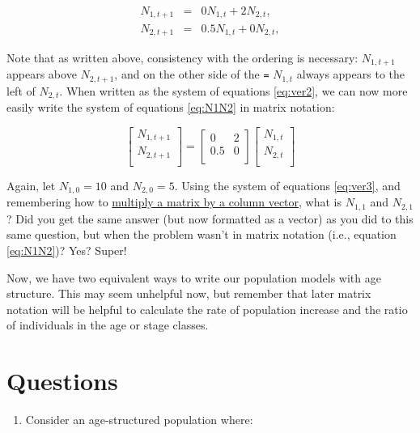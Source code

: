 \documentclass[]{book}
\providecommand{\tightlist}{%
  \setlength{\itemsep}{0pt}\setlength{\parskip}{0pt}}
\begin{document}
\begin{eqnarray}
N_{1,t+1} & = & 0 N_{1,t} + 2 N_{2,t}, \nonumber \\
N_{2,t+1} & = & 0.5 N_{1,t} + 0 N_{2,t},
 \label{eq:ver2}
\end{eqnarray}

Note that as written above, consistency with the ordering is necessary:
\(N_{1,t+1}\) appears above \(N_{2,t+1}\), and on the other side of the
\texttt{=} \(N_{1,t}\) always appears to the left of \(N_{2,t}\). When
written as the system of equations \eqref{eq:ver2}, we can now more easily
write the system of equations \eqref{eq:N1N2} in matrix notation:

\begin{equation}
\left[
\begin{array}{c}
N_{1,t+1}\\
N_{2,t+1}\\
\end{array}
\right]
=
\left[
\begin{array}{cc}
0 & 2\\
0.5 & 0\\
\end{array}
\right]
\left[
\begin{array}{c}
N_{1,t}\\
N_{2,t}\\
\end{array}
\right]
\label{eq:ver3}
\end{equation}

Again, let \(N_{1,0} = 10\) and \(N_{2,0} = 5\). Using the system of
equations \eqref{eq:ver3}, and remembering how to
\href{https://www.youtube.com/watch?v=Awcj447pYuk}{multiply a matrix by
a column vector}, what is \(N_{1,1}\) and \(N_{2,1}\)? Did you get the
same answer (but now formatted as a vector) as you did to this same
question, but when the problem wasn't in matrix notation (i.e., equation
\eqref{eq:N1N2})? Yes? Super!

Now, we have two equivalent ways to write our population models with age
structure. This may seem unhelpful now, but remember that later matrix
notation will be helpful to calculate the rate of population increase
and the ratio of individuals in the age or stage classes.

\section{Questions}\label{questions}

\begin{enumerate}
\def\labelenumi{\arabic{enumi}.}
\tightlist
\item
  Consider an age-structured population where:
\end{enumerate}
\end{document}
